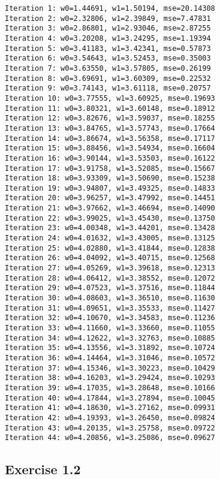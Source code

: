 \documentclass[11pt]{article}
\begin{document}
    \begin{Verbatim}[commandchars=\\\{\}]
Iteration 1: w0=1.44691, w1=1.50194, mse=20.14308
Iteration 2: w0=2.32806, w1=2.39849, mse=7.47831
Iteration 3: w0=2.86801, w1=2.93046, mse=2.87255
Iteration 4: w0=3.20208, w1=3.24295, mse=1.19394
Iteration 5: w0=3.41183, w1=3.42341, mse=0.57873
Iteration 6: w0=3.54643, w1=3.52453, mse=0.35003
Iteration 7: w0=3.63550, w1=3.57805, mse=0.26199
Iteration 8: w0=3.69691, w1=3.60309, mse=0.22532
Iteration 9: w0=3.74143, w1=3.61118, mse=0.20757
Iteration 10: w0=3.77555, w1=3.60925, mse=0.19693
Iteration 11: w0=3.80321, w1=3.60148, mse=0.18912
Iteration 12: w0=3.82676, w1=3.59037, mse=0.18255
Iteration 13: w0=3.84765, w1=3.57743, mse=0.17664
Iteration 14: w0=3.86674, w1=3.56358, mse=0.17117
Iteration 15: w0=3.88456, w1=3.54934, mse=0.16604
Iteration 16: w0=3.90144, w1=3.53503, mse=0.16122
Iteration 17: w0=3.91758, w1=3.52085, mse=0.15667
Iteration 18: w0=3.93309, w1=3.50690, mse=0.15238
Iteration 19: w0=3.94807, w1=3.49325, mse=0.14833
Iteration 20: w0=3.96257, w1=3.47992, mse=0.14451
Iteration 21: w0=3.97662, w1=3.46694, mse=0.14090
Iteration 22: w0=3.99025, w1=3.45430, mse=0.13750
Iteration 23: w0=4.00348, w1=3.44201, mse=0.13428
Iteration 24: w0=4.01632, w1=3.43005, mse=0.13125
Iteration 25: w0=4.02880, w1=3.41844, mse=0.12838
Iteration 26: w0=4.04092, w1=3.40715, mse=0.12568
Iteration 27: w0=4.05269, w1=3.39618, mse=0.12313
Iteration 28: w0=4.06412, w1=3.38552, mse=0.12072
Iteration 29: w0=4.07523, w1=3.37516, mse=0.11844
Iteration 30: w0=4.08603, w1=3.36510, mse=0.11630
Iteration 31: w0=4.09651, w1=3.35533, mse=0.11427
Iteration 32: w0=4.10670, w1=3.34583, mse=0.11236
Iteration 33: w0=4.11660, w1=3.33660, mse=0.11055
Iteration 34: w0=4.12622, w1=3.32763, mse=0.10885
Iteration 35: w0=4.13556, w1=3.31892, mse=0.10724
Iteration 36: w0=4.14464, w1=3.31046, mse=0.10572
Iteration 37: w0=4.15346, w1=3.30223, mse=0.10429
Iteration 38: w0=4.16203, w1=3.29424, mse=0.10293
Iteration 39: w0=4.17035, w1=3.28648, mse=0.10166
Iteration 40: w0=4.17844, w1=3.27894, mse=0.10045
Iteration 41: w0=4.18630, w1=3.27162, mse=0.09931
Iteration 42: w0=4.19393, w1=3.26450, mse=0.09824
Iteration 43: w0=4.20135, w1=3.25758, mse=0.09722
Iteration 44: w0=4.20856, w1=3.25086, mse=0.09627

    \end{Verbatim}

    \subsection{Exercise 1.2}\label{exercise-1.2}
\end{document}
